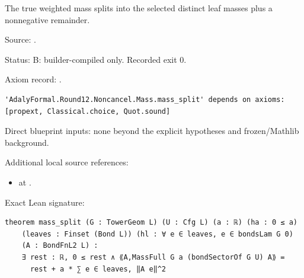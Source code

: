 \begin{theorem}[bp-213]
\label{bp-213}
\uses{}
\leanok
The true weighted mass splits into the selected distinct leaf masses plus a nonnegative remainder.

\par Source: \texttt{}.
\par Status: B: builder-compiled only. Recorded exit 0.
\par Axiom record: \texttt{}.
\begin{verbatim}
'AdalyFormal.Round12.Noncancel.Mass.mass_split' depends on axioms: [propext, Classical.choice, Quot.sound]
\end{verbatim}
\par Direct blueprint inputs: none beyond the explicit hypotheses and frozen/Mathlib background.
\par Additional local source references:
\begin{itemize}
\item \texttt{} at \texttt{}.
\end{itemize}
\par Exact Lean signature:
\begin{verbatim}
theorem mass_split (G : TowerGeom L) (U : Cfg L) (a : ℝ) (ha : 0 ≤ a)
    (leaves : Finset (Bond L)) (hl : ∀ e ∈ leaves, e ∈ bondsLam G 0)
    (A : BondFnL2 L) :
    ∃ rest : ℝ, 0 ≤ rest ∧ ⟪A,MassFull G a (bondSectorOf G U) A⟫ =
      rest + a * ∑ e ∈ leaves, ‖A e‖^2
\end{verbatim}
\end{theorem}

